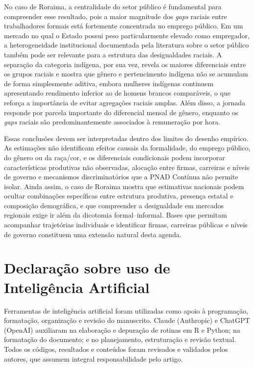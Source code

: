 \documentclass[12pt,a4paper]{article}
\begin{document}
No caso de Roraima, a centralidade do setor público é fundamental para
compreender esse resultado, pois a maior magnitude dos \textit{gaps} raciais
entre trabalhadores formais está fortemente concentrada no emprego público. Em
um mercado no qual o Estado possui peso particularmente elevado como empregador,
a heterogeneidade institucional documentada pela literatura sobre o setor
público \citep{foguel2000, moriconi2009, mattos2022, baez2021} também pode ser
relevante para a estrutura das desigualdades raciais. A separação da categoria
indígena, por sua vez, revela os maiores diferenciais entre os grupos raciais e
mostra que gênero e pertencimento indígena não se acumulam de forma
simplesmente aditiva, embora mulheres indígenas continuem apresentando
rendimento inferior ao de homens brancos comparáveis, o que reforça a
importância de evitar agregações raciais amplas. Além disso, a jornada responde
por parcela importante do diferencial mensal de gênero, enquanto os
\textit{gaps} raciais são predominantemente associados à remuneração por hora.

Essas conclusões devem ser interpretadas dentro dos limites do desenho
empírico. As estimações não identificam efeitos causais da formalidade, do
emprego público, do gênero ou da raça/cor, e os diferenciais condicionais podem
incorporar características produtivas não observadas, alocação entre firmas,
carreiras e níveis de governo e mecanismos discriminatórios que a PNAD Contínua
não permite isolar. Ainda assim, o caso de Roraima mostra que estimativas
nacionais podem ocultar combinações específicas entre estrutura produtiva,
presença estatal e composição demográfica, e que compreender a desigualdade em
mercados regionais exige ir além da dicotomia formal--informal. Bases que
permitam acompanhar trajetórias individuais e identificar firmas, carreiras
públicas e níveis de governo constituem uma extensão natural desta agenda.

\begingroup
\normalsize
\section{Declaração sobre uso de Inteligência Artificial}

Ferramentas de inteligência artificial foram utilizadas como apoio à programação, 
formatação, organização e revisão do manuscrito. Claude (Anthropic) e ChatGPT
(OpenAI) auxiliaram na elaboração e depuração de rotinas em R e Python; na formatação 
do documento; e no planejamento, estruturação e revisão textual. 
Todos os códigos, resultados e conteúdos foram revisados e validados pelos autores, 
que assumem integral responsabilidade pelo artigo.

\endgroup

\begingroup
\small\singlespacing
\setlength{\bibsep}{6pt}


\endgroup
\end{document}
